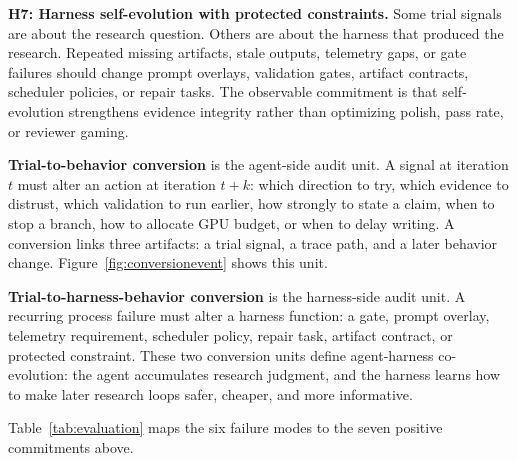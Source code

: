 \documentclass{article}
\begin{document}
\textbf{H7: Harness self-evolution with protected constraints.}
Some trial signals are about the research question. Others are about the harness that produced the research. Repeated missing artifacts, stale outputs, telemetry gaps, or gate failures should change prompt overlays, validation gates, artifact contracts, scheduler policies, or repair tasks. The observable commitment is that self-evolution strengthens evidence integrity rather than optimizing polish, pass rate, or reviewer gaming.

\textbf{Trial-to-behavior conversion} is the agent-side audit unit. A signal at iteration $t$ must alter an action at iteration $t+k$: which direction to try, which evidence to distrust, which validation to run earlier, how strongly to state a claim, when to stop a branch, how to allocate GPU budget, or when to delay writing. A conversion links three artifacts: a trial signal, a trace path, and a later behavior change. Figure~\ref{fig:conversionevent} shows this unit.

\textbf{Trial-to-harness-behavior conversion} is the harness-side audit unit. A recurring process failure must alter a harness function: a gate, prompt overlay, telemetry requirement, scheduler policy, repair task, artifact contract, or protected constraint. These two conversion units define agent-harness co-evolution: the agent accumulates research judgment, and the harness learns how to make later research loops safer, cheaper, and more informative.

Table~\ref{tab:evaluation} maps the six failure modes to the seven positive commitments above.
\end{document}
